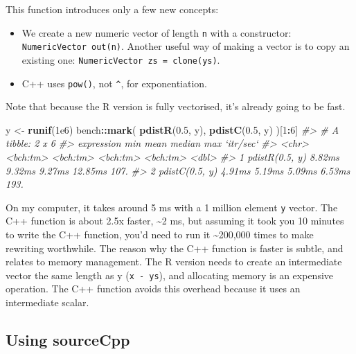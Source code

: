 \documentclass[]{book}
\newenvironment{Shaded}{\begin{snugshade}}{\end{snugshade}}
\newcommand{\CommentTok}[1]{\textcolor[rgb]{0.37,0.37,0.37}{\textit{#1}}}
\newcommand{\DecValTok}[1]{\textcolor[rgb]{0.06,0.06,0.06}{#1}}
\newcommand{\FloatTok}[1]{\textcolor[rgb]{0.06,0.06,0.06}{#1}}
\newcommand{\KeywordTok}[1]{\textcolor[rgb]{0.27,0.27,0.27}{\textbf{#1}}}
\newcommand{\NormalTok}[1]{#1}
\newcommand{\OperatorTok}[1]{\textcolor[rgb]{0.43,0.43,0.43}{\textbf{#1}}}
\newcommand{\StringTok}[1]{\textcolor[rgb]{0.5,0.5,0.5}{#1}}
\begin{document}
This function introduces only a few new concepts:

\begin{itemize}
\item
  We create a new numeric vector of length \texttt{n} with a constructor:
  \texttt{NumericVector\ out(n)}. Another useful way of making a vector is to copy an
  existing one: \texttt{NumericVector\ zs\ =\ clone(ys)}.
\item
  C++ uses \texttt{pow()}, not \texttt{\^{}}, for exponentiation.
\end{itemize}

Note that because the R version is fully vectorised, it's already going to be fast.

\begin{Shaded}
\begin{Highlighting}[]
\NormalTok{y <-}\StringTok{ }\KeywordTok{runif}\NormalTok{(}\FloatTok{1e6}\NormalTok{)}
\NormalTok{bench}\OperatorTok{::}\KeywordTok{mark}\NormalTok{(}
  \KeywordTok{pdistR}\NormalTok{(}\FloatTok{0.5}\NormalTok{, y),}
  \KeywordTok{pdistC}\NormalTok{(}\FloatTok{0.5}\NormalTok{, y)}
\NormalTok{)[}\DecValTok{1}\OperatorTok{:}\DecValTok{6}\NormalTok{]}
\CommentTok{#> # A tibble: 2 x 6}
\CommentTok{#>   expression          min     mean   median      max `itr/sec`}
\CommentTok{#>   <chr>          <bch:tm> <bch:tm> <bch:tm> <bch:tm>     <dbl>}
\CommentTok{#> 1 pdistR(0.5, y)   8.82ms   9.32ms   9.27ms  12.85ms      107.}
\CommentTok{#> 2 pdistC(0.5, y)   4.91ms   5.19ms   5.09ms   6.53ms      193.}
\end{Highlighting}
\end{Shaded}

On my computer, it takes around 5 ms with a 1 million element \texttt{y} vector. The C++ function is about 2.5x faster, \textasciitilde{}2 ms, but assuming it took you 10 minutes to write the C++ function, you'd need to run it \textasciitilde{}200,000 times to make rewriting worthwhile. The reason why the C++ function is faster is subtle, and relates to memory management. The R version needs to create an intermediate vector the same length as y (\texttt{x\ -\ ys}), and allocating memory is an expensive operation. The C++ function avoids this overhead because it uses an intermediate scalar.

\hypertarget{sourceCpp}{%
\subsection{Using sourceCpp}\label{sourceCpp}}
\end{document}
